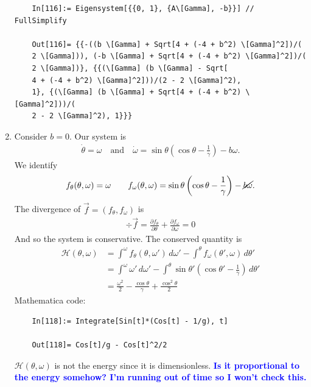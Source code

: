\documentclass{article}
\theoremstyle{definition}
\newcommand{\p}{\partial}
\newcommand{\ham}{\mathcal{H}}
\newcommand{\f}[2]{\frac{#1}{#2}}
\newcommand{\lp}{\left(}
\newcommand{\rp}{\right)}
\begin{document}
\begin{enumerate}[label=(\alph*)]
\begin{lstlisting}
	In[116]:= Eigensystem[{{0, 1}, {A\[Gamma], -b}}] // FullSimplify
	
	Out[116]= {{-((b \[Gamma] + Sqrt[4 + (-4 + b^2) \[Gamma]^2])/(
	2 \[Gamma])), (-b \[Gamma] + Sqrt[4 + (-4 + b^2) \[Gamma]^2])/(
	2 \[Gamma])}, {{(\[Gamma] (b \[Gamma] - Sqrt[
	4 + (-4 + b^2) \[Gamma]^2]))/(2 - 2 \[Gamma]^2), 
	1}, {(\[Gamma] (b \[Gamma] + Sqrt[4 + (-4 + b^2) \[Gamma]^2]))/(
	2 - 2 \[Gamma]^2), 1}}}
	\end{lstlisting}
	
	
	
	
	
	
	
	
	
	\item Consider $b=0$. Our system is 
	\begin{align*}
	\dot \theta = \omega \quad\text{and} \quad \dot \omega = \sin\theta \lp \cos\theta - \f{1}{\gamma}\rp - b \omega.
	\end{align*}
	We identify 
	\begin{align*}
	f_\theta(\theta,\omega) = \omega \quad\quad f_\omega(\theta,\omega) = \sin\theta \lp \cos\theta - \f{1}{\gamma}\rp - \cancel{ b \omega}.
	\end{align*}
	The divergence of $\vec{f} = (f_\theta,f_\omega)$ is 
	\begin{align*}
	\div \vec{f} = \f{\p f_\theta}{\p \theta} + \f{\p f_\omega}{\p \omega} =  0
	\end{align*}
	And so the system is conservative. The conserved quantity is 
	\begin{align*}
	\ham(\theta,\omega) 
	&= \int^\omega f_\theta (\theta,\omega')\,d\omega' - \int^\theta f_\omega(\theta',\omega)\,d\theta' \\
	&= \int^\omega \omega'\,d\omega' - \int^\theta \sin\theta' \lp \cos\theta' - \f{1}{\gamma}\rp \,d\theta'\\
	&= \boxed{\f{\omega^2}{2} -  \f{\cos\theta}{\gamma} + \f{\cos^2\theta}{2} }
	\end{align*}
	Mathematica code:
	\begin{lstlisting}
	In[118]:= Integrate[Sin[t]*(Cos[t] - 1/g), t]
	
	Out[118]= Cos[t]/g - Cos[t]^2/2
	\end{lstlisting}
	$\ham(\theta,\omega)$ is not the energy since it is dimensionless. \textbf{\textcolor{blue}{Is it proportional to the energy somehow? I'm running out of time so I won't check this.}}
	

\end{enumerate}
\end{document}
